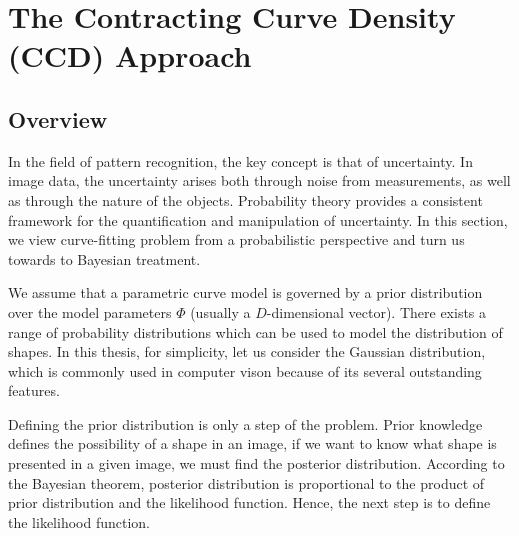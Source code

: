 \section{The Contracting Curve Density (CCD) Approach}
\label{sec:sketch}

\subsection{Overview}
\label{sec:overview}

In the field of pattern recognition, the key concept is that of
uncertainty. In image data, the uncertainty arises both
through noise from measurements, as well as through the nature of
the objects. Probability theory provides a consistent framework for the
quantification and manipulation of uncertainty.  In this section, we
view curve-fitting problem from a probabilistic perspective and turn
us towards to Bayesian treatment.


We assume that a parametric curve model is governed by a prior distribution
over the model parameters $\Phi$ (usually a $D$-dimensional
vector). There exists a range of probability distributions which can
be used to model the distribution of shapes. In this thesis, for
simplicity, let us consider the Gaussian distribution, which is commonly
used in computer vison because of its several outstanding features.


Defining the prior distribution is only a step of the problem. Prior knowledge
defines the possibility of a shape in an image, if we want to know what
shape is presented in a given image, we must find the posterior
distribution. According to the Bayesian theorem, posterior distribution
is proportional to the product of prior distribution and the likelihood
function. Hence, the next step is to define the likelihood function.

